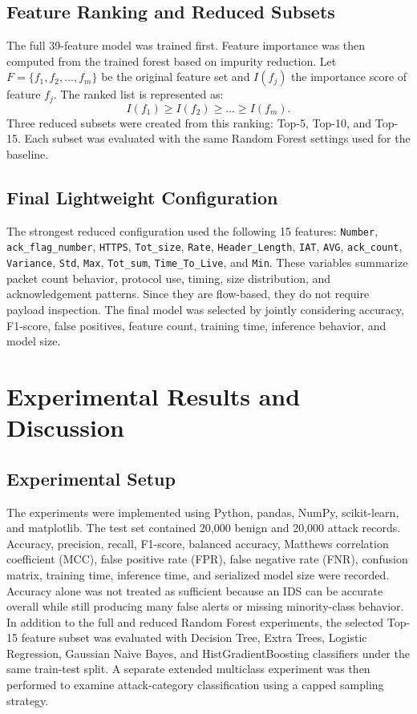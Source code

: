 \documentclass[journal]{IEEEtran}
\begin{document}
\subsection{Feature Ranking and Reduced Subsets}

The full 39-feature model was trained first. Feature importance was then computed from the trained forest based on impurity reduction. Let $F=\{f_1,f_2,\ldots,f_m\}$ be the original feature set and $I(f_j)$ the importance score of feature $f_j$. The ranked list is represented as:
\begin{equation}
I(f_1)\geq I(f_2)\geq \ldots \geq I(f_m).
\end{equation}
Three reduced subsets were created from this ranking: Top-5, Top-10, and Top-15. Each subset was evaluated with the same Random Forest settings used for the baseline.

\subsection{Final Lightweight Configuration}

The strongest reduced configuration used the following 15 features: \texttt{Number}, \texttt{ack\_flag\_number}, \texttt{HTTPS}, \texttt{Tot\_size}, \texttt{Rate}, \texttt{Header\_Length}, \texttt{IAT}, \texttt{AVG}, \texttt{ack\_count}, \texttt{Variance}, \texttt{Std}, \texttt{Max}, \texttt{Tot\_sum}, \texttt{Time\_To\_Live}, and \texttt{Min}. These variables summarize packet count behavior, protocol use, timing, size distribution, and acknowledgement patterns. Since they are flow-based, they do not require payload inspection. The final model was selected by jointly considering accuracy, F1-score, false positives, feature count, training time, inference behavior, and model size.

\section{Experimental Results and Discussion}
\label{sec:results}

\subsection{Experimental Setup}

The experiments were implemented using Python, pandas, NumPy, scikit-learn, and matplotlib. The test set contained 20,000 benign and 20,000 attack records. Accuracy, precision, recall, F1-score, balanced accuracy, Matthews correlation coefficient (MCC), false positive rate (FPR), false negative rate (FNR), confusion matrix, training time, inference time, and serialized model size were recorded. Accuracy alone was not treated as sufficient because an IDS can be accurate overall while still producing many false alerts or missing minority-class behavior. In addition to the full and reduced Random Forest experiments, the selected Top-15 feature subset was evaluated with Decision Tree, Extra Trees, Logistic Regression, Gaussian Naive Bayes, and HistGradientBoosting classifiers under the same train-test split. A separate extended multiclass experiment was then performed to examine attack-category classification using a capped sampling strategy.
\end{document}
